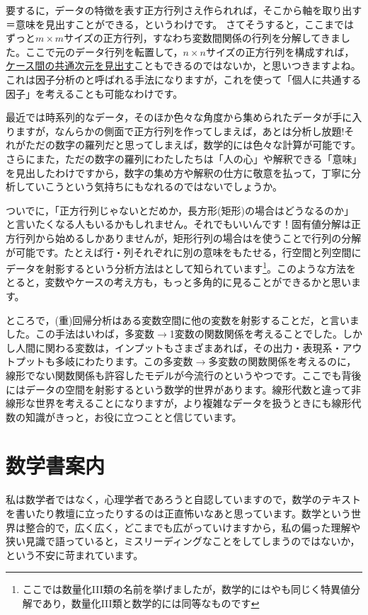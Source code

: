 \documentclass{ltjsbook}
\begin{document}
要するに，データの特徴を表す正方行列さえ作られれば，そこから軸を取り出す＝意味を見出すことができる，というわけです。
さてそうすると，ここまではずっと$m \times m$サイズの正方行列，すなわち変数間関係の行列を分解してきました。ここで元のデータ行列を転置して，$n \times n$サイズの正方行列を構成すれば，\underline{ケース間の共通次元を見出す}こともできるのではないか，と思いつきますよね。これは因子分析のと呼ばれる手法になりますが，これを使って「個人に共通する因子」を考えることも可能なわけです。

最近では時系列的なデータ，そのほか色々な角度から集められたデータが手に入りますが，なんらかの側面で正方行列を作ってしまえば，あとは分析し放題!それがただの数字の羅列だと思ってしまえば，数学的には色々な計算が可能です。さらにまた，ただの数字の羅列にわたしたちは「人の心」や解釈できる「意味」を見出したわけですから，数字の集め方や解釈の仕方に敬意を払って，丁寧に分析していこうという気持ちにもなれるのではないでしょうか。

ついでに，「正方行列じゃないとだめか，長方形(矩形)の場合はどうなるのか」と言いたくなる人もいるかもしれません。それでもいいんです！固有値分解は正方行列から始めるしかありませんが，矩形行列の場合はを使うことで行列の分解が可能です。たとえば行・列それぞれに別の意味をもたせる，行空間と列空間にデータを射影するという分析方法はとして知られています\footnote{ここでは数量化III類の名前を挙げましたが，数学的にはやも同じく特異値分解であり，数量化III類と数学的には同等なものです}。このような方法をとると，変数やケースの考え方も，もっと多角的に見ることができるかと思います。

ところで，(重)回帰分析はある変数空間に他の変数を射影することだ，と言いました。この手法はいわば，多変数$\to$1変数の関数関係を考えることでした。しかし人間に関わる変数は，インプットもさまざまあれば，その出力・表現系・アウトプットも多岐にわたります。この多変数$\to$多変数の関数関係を考えるのに，線形でない関数関係も許容したモデルが今流行のというやつです。ここでも背後にはデータの空間を射影するという数学的世界があります。線形代数と違って非線形な世界を考えることになりますが，より複雑なデータを扱うときにも線形代数の知識がきっと，お役に立つことと信じています。

\section{数学書案内}
私は数学者ではなく，心理学者であろうと自認していますので，数学のテキストを書いたり教壇に立ったりするのは正直怖いなあと思っています。数学という世界は整合的で，広く広く，どこまでも広がっていけますから，私の偏った理解や狭い見識で語っていると，ミスリーディングなことをしてしまうのではないか，という不安に苛まれています。
\end{document}
